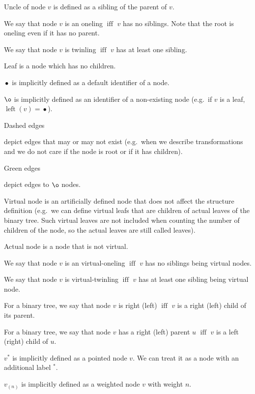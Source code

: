 \documentclass[final]{article}
\theoremstyle{definition}
\theoremstyle{definition}
\theoremstyle{remark}
\newcommand{\pointed}[1]{\ensuremath{{#1}^*}}
\newcommand{\weighted}[1]{\ensuremath{_{(#1)}}}
\DeclareMathOperator{\textiff}{\text{iff}}
\DeclareMathOperator{\tleft}{\text{left}}
\DeclareMathOperator{\n}{\bullet}
\DeclareMathOperator{\no}{\o}
\begin{document}
Uncle of node \(v\) is defined as a sibling of the parent of \(v\).

We say that node \(v\) is an oneling \(\textiff\) \(v\) has no siblings. Note that the root is oneling even if it has no parent.

We say that node \(v\) is twinling \(\textiff\) \(v\) has at least one sibling.

Leaf is a node which has no children.

\(\n\) is implicitly defined as a default identifier of a node.

\(\no\) is implicitly defined as an identifier of a non-existing node (e.g.\ if \(v\) is a leaf, \(\tleft(v) = \n\)).

Dashed edges 
\begin{minipage}{1.5em}

\end{minipage}
depict edges that may or may not exist (e.g.\ when we describe transformations and we do not care if the node is root or if it has children).

Green edges 
\begin{minipage}{1.5em}

\end{minipage}
depict edges to \(\no\) nodes.

Virtual node is an artificially defined node that does not affect the structure definition (e.g.\ we can define virtual leafs that are children of actual leaves of the binary tree. Such virtual leaves are not included when counting the number of children of the node, so the actual leaves are still called leaves).

Actual node is a node that is not virtual.

We say that node \(v\) is an virtual-oneling \(\textiff\) \(v\) has no siblings being virtual nodes.

We say that node \(v\) is virtual-twinling \(\textiff\) \(v\) has at least one sibling being virtual node.

For a binary tree, we say that node \(v\) is right (left) \(\textiff\) \(v\) is a right (left) child of its parent.

For a binary tree, we say that node \(v\) has a right (left) parent \(u\) \(\textiff\) \(v\) is a left (right) child of \(u\).

\(\pointed{v}\) is implicitly defined as a pointed node \(v\). We can treat it as a node with an additional label \(\pointed{}\).

\(v\weighted{n}\) is implicitly defined as a weighted node \(v\) with weight \(n\).
\end{document}
